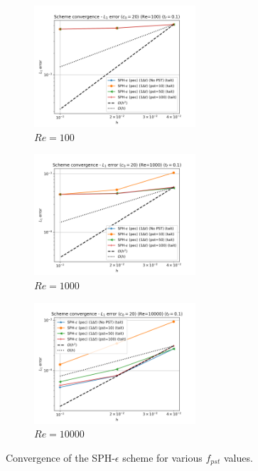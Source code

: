 \begin{figure}[htbp!]
  \begin{subfigure}{7cm}
  \centering\includegraphics[width=6cm]{Code-Figures/mon2017/pst/dt_pois_conv_c0_20_re_100.png}
  \caption{$Re = 100$}
  \end{subfigure}
  \begin{subfigure}{7cm}
  \centering\includegraphics[width=6cm]{Code-Figures/mon2017/pst/dt_pois_conv_c0_20_re_1000.png}
  \caption{$Re = 1000$}
  \end{subfigure}
  \begin{subfigure}{7cm}
  \centering\includegraphics[width=6cm]{Code-Figures/mon2017/pst/dt_pois_conv_c0_20_re_10000.png}
  \caption{$Re = 10000$}
  \end{subfigure}
  \caption{Convergence of the SPH-$\epsilon$ scheme for various $f_{pst}$ values.}
  \label{fig:sph-eps-pst}
\end{figure}

